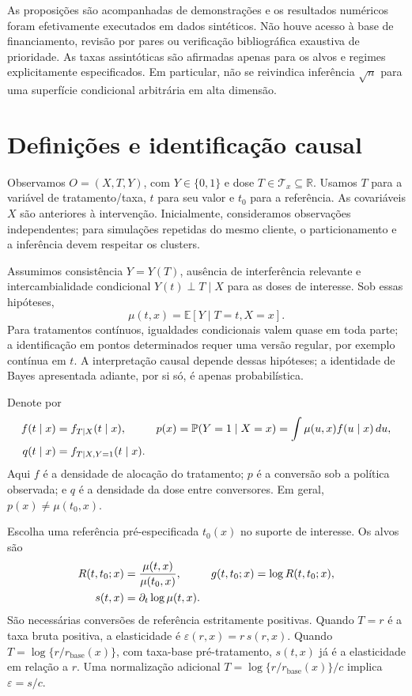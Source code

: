 \documentclass[11pt,a4paper]{article}
\newcommand{\E}{\mathbb E}
\newcommand{\Pp}{\mathbb P}
\newcommand{\R}{\mathbb R}
\begin{document}
As proposições são acompanhadas de demonstrações e os resultados numéricos foram efetivamente executados em dados sintéticos. Não houve acesso à base de financiamento, revisão por pares ou verificação bibliográfica exaustiva de prioridade. As taxas assintóticas são afirmadas apenas para os alvos e regimes explicitamente especificados. Em particular, não se reivindica inferência $\sqrt n$ para uma superfície condicional arbitrária em alta dimensão.

\section{Definições e identificação causal}
\label{sec:setup}
Observamos $O=(X,T,Y)$, com $Y\in\{0,1\}$ e dose $T\in\mathcal T_x\subseteq\R$. Usamos $T$ para a variável de tratamento/taxa, $t$ para seu valor e $t_0$ para a referência. As covariáveis $X$ são anteriores à intervenção. Inicialmente, consideramos observações independentes; para simulações repetidas do mesmo cliente, o particionamento e a inferência devem respeitar os clusters.

Assumimos consistência $Y=Y(T)$, ausência de interferência relevante e intercambialidade condicional $Y(t)\perp T\mid X$ para as doses de interesse. Sob essas hipóteses,
\[
\mu(t,x)=\E[Y\mid T=t,X=x].
\]
Para tratamentos contínuos, igualdades condicionais valem quase em toda parte; a identificação em pontos determinados requer uma versão regular, por exemplo contínua em $t$. A interpretação causal depende dessas hipóteses; a identidade de Bayes apresentada adiante, por si só, é apenas probabilística.

Denote por
\begin{align}
f(t\mid x)&=f_{T\mid X}(t\mid x),&
p(x)&=\Pp(Y=1\mid X=x)=\int\mu(u,x)f(u\mid x)\,du,\label{eq:defs}\\
q(t\mid x)&=f_{T\mid X,Y=1}(t\mid x).&&\notag
\end{align}
Aqui $f$ é a densidade de alocação do tratamento; $p$ é a conversão sob a política observada; e $q$ é a densidade da dose entre conversores. Em geral, $p(x)\ne\mu(t_0,x)$.

Escolha uma referência pré-especificada $t_0(x)$ no suporte de interesse. Os alvos são
\begin{align}
R(t,t_0;x)&=\frac{\mu(t,x)}{\mu(t_0,x)},&
g(t,t_0;x)&=\log R(t,t_0;x),\label{eq:targets}\\
s(t,x)&=\partial_t\log\mu(t,x).&&\notag
\end{align}
São necessárias conversões de referência estritamente positivas. Quando $T=r$ é a taxa bruta positiva, a elasticidade é $\varepsilon(r,x)=r\,s(r,x)$. Quando $T=\log\{r/r_{\mathrm{base}}(x)\}$, com taxa-base pré-tratamento, $s(t,x)$ já é a elasticidade em relação a $r$. Uma normalização adicional $T=\log\{r/r_{\mathrm{base}}(x)\}/c$ implica $\varepsilon=s/c$.
\end{document}
